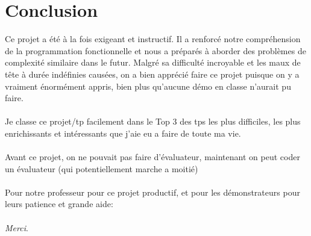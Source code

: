 \documentclass[12pt]{article}
\begin{document}
\section{Conclusion}
Ce projet a été à la fois exigeant et instructif. Il a renforcé notre compréhension de la programmation fonctionnelle et nous a préparés à aborder des problèmes de complexité similaire dans le futur. Malgré sa difficulté incroyable et les maux de tête à durée indéfinies causées, on a bien apprécié faire ce projet puisque on y a vraiment énormément appris, bien plus qu'aucune démo en classe n'aurait pu faire.\mbox{}\\\mbox{}\\
Je classe ce projet/tp facilement dans le Top 3 des tps les plus difficiles, les plus enrichissants et intéressants que j'aie eu a faire de toute ma vie.\mbox{}\\\mbox{}\\
Avant ce projet, on ne pouvait pas faire d'évaluateur, maintenant on peut coder un évaluateur (qui potentiellement marche a moitié)
\mbox{}\\
\mbox{}\\
Pour notre professeur pour ce projet productif, et pour les démonstrateurs pour leurs patience et grande aide:
\mbox{}\\
\mbox{}\\
\textit{Merci}.
\end{document}
